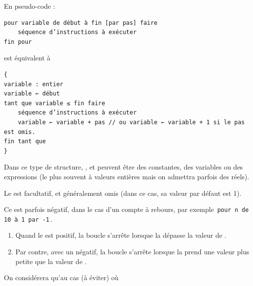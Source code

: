 \documentclass[11pt,a4paper]{article}
\begin{document}
            \par
        En pseudo-code :
            \par
        \begin{verbatim}
pour variable de début à fin [par pas] faire
    séquence d’instructions à exécuter
fin pour
      \end{verbatim} est \'equivalent \`a 
            \par
        \begin{verbatim}
{
variable : entier
variable ← début
tant que variable ≤ fin faire
    séquence d’instructions à exécuter
    variable ← variable + pas // ou variable ← variable + 1 si le pas est omis.
fin tant que
}
      \end{verbatim}
        Dans ce type de structure, , 
        \verb@fin@ et \verb@pas@ 
        peuvent \^etre des constantes, des variables ou
        des expressions (le plus souvent \`a valeurs enti\`eres mais on admettra parfois des r\'eels). 
      
            \par
        
        Le \verb@pas@ est facultatif, et g\'en\'eralement omis (dans ce cas, sa valeur par d\'efaut est 1). 
      
            \par
        
        Ce \verb@pas@ est parfois n\'egatif, dans le cas d'un compte \`a rebours, 
        par exemple \,\verb|pour n de 10 à 1 par -1|\,.
      
            \par
        
					\begin{enumerate}
				
			\item 
            Quand le \verb@pas@ est positif, 
            la boucle s'arr\^ete lorsque la \verb@variable@ 
            d\'epasse la valeur de \verb@fin@.
          
			\item 
            Par contre, avec un \verb@pas@ n\'egatif, 
            la boucle s'arr\^ete lorsque la \verb@variable@ 
            prend une valeur plus petite que la valeur de \verb@fin@.
          
					\end{enumerate}
				
            \par
        
        On consid\'erera qu'au cas (\`a \'eviter) o\`u
        
\end{document}
